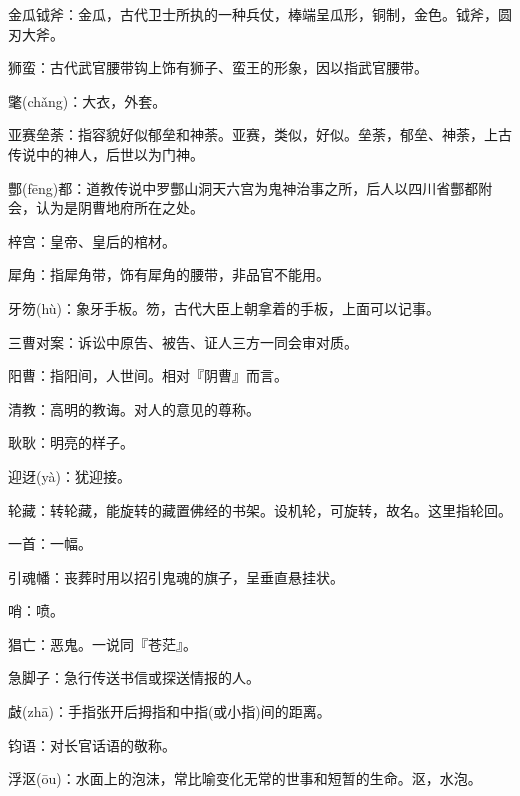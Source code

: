 \startbuffer[429]
金瓜钺斧：金瓜，古代卫士所执的一种兵仗，棒端呈瓜形，铜制，金色。钺斧，圆刃大斧。
\stopbuffer


\startbuffer[430]
狮蛮：古代武官腰带钩上饰有狮子、蛮王的形象，因以指武官腰带。
\stopbuffer


\startbuffer[431]
氅(chǎng)：大衣，外套。
\stopbuffer


\startbuffer[432]
亚赛垒荼：指容貌好似郁垒和神荼。亚赛，类似，好似。垒荼，郁垒、神荼，上古传说中的神人，后世以为门神。
\stopbuffer


\startbuffer[433]
酆(fēng)都：道教传说中罗酆山洞天六宫为鬼神治事之所，后人以四川省酆都附会，认为是阴曹地府所在之处。
\stopbuffer


\startbuffer[434]
梓宫：皇帝、皇后的棺材。
\stopbuffer


\startbuffer[435]
犀角：指犀角带，饰有犀角的腰带，非品官不能用。
\stopbuffer


\startbuffer[436]
牙笏(hù)：象牙手板。笏，古代大臣上朝拿着的手板，上面可以记事。
\stopbuffer


\startbuffer[437]
三曹对案：诉讼中原告、被告、证人三方一同会审对质。
\stopbuffer


\startbuffer[438]
阳曹：指阳间，人世间。相对『阴曹』而言。
\stopbuffer


\startbuffer[439]
清教：高明的教诲。对人的意见的尊称。
\stopbuffer


\startbuffer[440]
耿耿：明亮的样子。
\stopbuffer


\startbuffer[441]
迎迓(yà)：犹迎接。
\stopbuffer


\startbuffer[442]
轮藏：转轮藏，能旋转的藏置佛经的书架。设机轮，可旋转，故名。这里指轮回。
\stopbuffer


\startbuffer[443]
一首：一幅。
\stopbuffer


\startbuffer[444]
引魂幡：丧葬时用以招引鬼魂的旗子，呈垂直悬挂状。
\stopbuffer


\startbuffer[445]
哨：喷。
\stopbuffer


\startbuffer[446]
猖亡：恶鬼。一说同『苍茫』。
\stopbuffer


\startbuffer[447]
急脚子：急行传送书信或探送情报的人。
\stopbuffer


\startbuffer[448]
㪥(zhā)：手指张开后拇指和中指(或小指)间的距离。
\stopbuffer


\startbuffer[449]
钧语：对长官话语的敬称。
\stopbuffer


\startbuffer[450]
浮沤(ōu)：水面上的泡沫，常比喻变化无常的世事和短暂的生命。沤，水泡。
\stopbuffer



